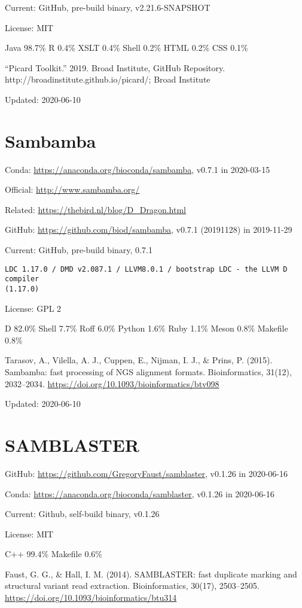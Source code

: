 \documentclass[]{article}
\begin{document}
Current: GitHub, pre-build binary, v2.21.6-SNAPSHOT

License: MIT

Java 98.7\% R 0.4\% XSLT 0.4\% Shell 0.2\% HTML 0.2\% CSS 0.1\% 

``Picard Toolkit.'' 2019. Broad Institute, GitHub Repository. http://broadinstitute.github.io/picard/; Broad Institute

Updated: 2020-06-10

\section{Sambamba}

Conda: \url{https://anaconda.org/bioconda/sambamba}, v0.7.1 in 2020-03-15 

Official: \url{http://www.sambamba.org/}

Related: \url{https://thebird.nl/blog/D_Dragon.html}

GitHub: \url{https://github.com/biod/sambamba}, v0.7.1 (20191128) in 2019-11-29

Current: GitHub, pre-build binary, 0.7.1

\begin{verbatim}
LDC 1.17.0 / DMD v2.087.1 / LLVM8.0.1 / bootstrap LDC - the LLVM D compiler
(1.17.0)
\end{verbatim}

License: GPL 2

D 82.0\% Shell 7.7\% Roff 6.0\% Python 1.6\% Ruby 1.1\% Meson 0.8\% Makefile 0.8\%

Tarasov, A., Vilella, A. J., Cuppen, E., Nijman, I. J., \& Prins, P. (2015). Sambamba: fast processing of NGS alignment formats. Bioinformatics, 31(12), 2032–2034. \url{https://doi.org/10.1093/bioinformatics/btv098}

Updated: 2020-06-10

\section{SAMBLASTER}

GitHub: \url{https://github.com/GregoryFaust/samblaster}, v0.1.26 in 2020-06-16

Conda: \url{https://anaconda.org/bioconda/samblaster}, v0.1.26 in 2020-06-16

Current: Github, self-build binary, v0.1.26

License: MIT

C++ 99.4\% Makefile 0.6\%

Faust, G. G., \& Hall, I. M. (2014). SAMBLASTER: fast duplicate marking and structural variant read extraction. Bioinformatics, 30(17), 2503–2505. \url{https://doi.org/10.1093/bioinformatics/btu314}
\end{document}

